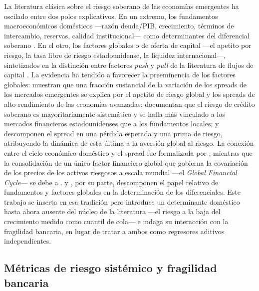 La literatura clásica sobre el riesgo soberano de las economías emergentes ha oscilado entre dos polos explicativos. En un extremo, los fundamentos macroeconómicos domésticos —razón deuda/PIB, crecimiento, términos de intercambio, reservas, calidad institucional— como determinantes del diferencial soberano \citep{Edwards1984,HilscherNosbusch2010}. En el otro, los factores globales o de oferta de capital —el apetito por riesgo, la tasa libre de riesgo estadounidense, la liquidez internacional—, sintetizados en la distinción entre factores \textit{push} y \textit{pull} de la literatura de flujos de capital \citep{CalvoLeidermanReinhart1996}. La evidencia ha tendido a favorecer la preeminencia de los factores globales: \citet{GonzalezRozadaLevyYeyati2008} muestran que una fracción sustancial de la variación de los spreads de los mercados emergentes se explica por el apetito de riesgo global y los spreads de alto rendimiento de las economías avanzadas; \citet{LongstaffEtAl2011} documentan que el riesgo de crédito soberano es mayoritariamente sistemático y se halla más vinculado a los mercados financieros estadounidenses que a los fundamentos locales; y \citet{RemolonaScatignaWu2008} descomponen el spread en una pérdida esperada y una prima de riesgo, atribuyendo la dinámica de esta última a la aversión global al riesgo. La conexión entre el ciclo económico doméstico y el spread fue formalizada por \citet{UribeYue2006}, mientras que la consolidación de un único factor financiero global que gobierna la covariación de los precios de los activos riesgosos a escala mundial —el \textit{Global Financial Cycle}— se debe a \citet{MirandaAgrippinoRey2022}. \citet{CavalloValenzuela2010} y \citet{CsontoIvaschenko2013}, por su parte, descomponen el papel relativo de fundamentos y factores globales en la determinación de los diferenciales. Este trabajo se inserta en esa tradición pero introduce un determinante doméstico hasta ahora ausente del núcleo de la literatura —el riesgo a la baja del crecimiento medido como cuantil de cola— e indaga su interacción con la fragilidad bancaria, en lugar de tratar a ambos como regresores aditivos independientes.

\subsection{Métricas de riesgo sistémico y fragilidad bancaria}


